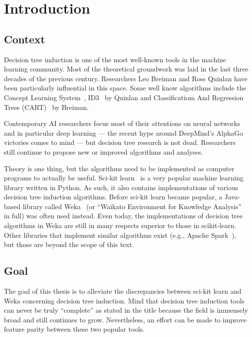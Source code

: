 \chapter{Introduction}\label{cha:intro}

\section{Context}
Decision tree induction is one of the most well-known tools in the machine learning community. Most of the theoretical groundwork was laid in the last three decades of the previous century. Researchers Leo Breiman and Ross Quinlan have been particularly influential in this space. Some well know algorithms include the Concept Learning System~\cite{cls}, ID3~\cite{id3, id3bis, id3ter} by Quinlan and Classificatiom And Regression Trees (CART)~\cite{cart} by Breiman. 

Contemporary AI researchers focus most of their attentions on neural networks and in particular deep learning --- the recent hype around DeepMind's AlphaGo~\cite{alphago} victories comes to mind --- but decision tree research is not dead. Researchers still continue to propose new or improved algorithms and analyses.

Theory is one thing, but the algorithms need to be implemented as computer programs to actually be useful. Sci-kit learn~\cite{scikit-learn} is a very popular machine learning library written in Python. As such, it also contains implementations of various decision tree induction algorithms. Before sci-kit learn became popular, a Java-based library called Weka~\cite{eibe2016weka} (or ``Waikato Environment for Knowledge Analysis'' in full) was often used instead. Even today, the implementations of decision tree algorithms in Weka are still in many respects superior to those in scikit-learn. Other libraries that implement similar algorithms exist (e.g., Apache Spark~\cite{spark}), but those are beyond the scope of this text.

\section{Goal}
The goal of this thesis is to alleviate the discrepancies between sci-kit learn and Weka concerning decision tree induction. Mind that decision tree induction tools can never be truly ``complete'' as stated in the title because the field is immensely broad and still continues to grow. Nevertheless, an effort can be made to improve feature parity between these two popular tools.

